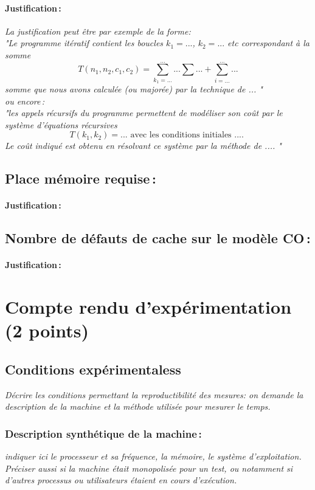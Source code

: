 \documentclass[a4paper,10pt,french]{article}
\begin{document}
    \paragraph{Justification\,: }
    {\em La justification peut être par exemple de la forme: \\
       "Le programme itératif contient les boucles $k_1=...$, $k_2= ...$ etc correspondant à la somme
      $$T(n_1, n_2, c_1, c_2) = \sum_{k_1=...}^{...} ... \sum ... + \sum_{i=...}^{...} ...$$
      somme que nous avons calculée (ou majorée) par la technique de  ... " \\
      ou  encore\,:  \\
      "les appels récursifs du programme permettent de modéliser son coût par le système d'équations récursives
      $$T(k_1, k_2) = ...  \mbox{~avec~les~conditions~initiales~....~} $$
      Le coût indiqué est obtenu en résolvant ce système par la méthode de  .... "
    }
  \subsection{Place mémoire requise\,: }
    \paragraph{Justification\,: }

  \subsection{Nombre de défauts de cache sur le modèle CO\,: }
    \paragraph{Justification\,: }


\section{Compte rendu d'expérimentation (2 points)}
  \subsection{Conditions expérimentaless}
     {\em Décrire les conditions permettant la reproductibilité des mesures: on demande la description
      de la machine et la méthode utilisée pour mesurer le temps.
     }

    \subsubsection{Description synthétique de la machine\,:}
      {\em indiquer ici le  processeur et sa fréquence, la mémoire, le système d'exploitation.
       Préciser aussi si la machine était monopolisée pour un test, ou notamment si
       d'autres processus ou utilisateurs étaient en cours d'exécution.
      }
\end{document}
